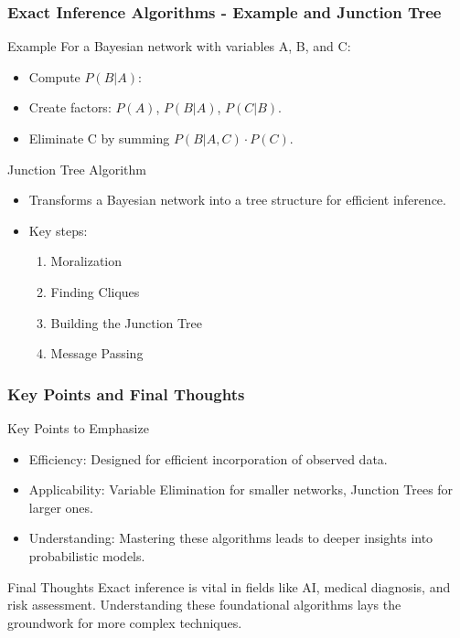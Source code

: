 \documentclass[aspectratio=169]{beamer}
\begin{document}
\begin{frame}[fragile]
    \frametitle{Exact Inference Algorithms - Example and Junction Tree}
    \begin{block}{Example}
        For a Bayesian network with variables A, B, and C:
        \begin{itemize}
            \item Compute $P(B | A)$:
            \item Create factors: $P(A)$, $P(B | A)$, $P(C | B)$.
            \item Eliminate C by summing $P(B | A, C) \cdot P(C)$.
        \end{itemize}
    \end{block}

    \begin{block}{Junction Tree Algorithm}
        \begin{itemize}
            \item Transforms a Bayesian network into a tree structure for efficient inference.
            \item Key steps: 
                \begin{enumerate}
                    \item Moralization
                    \item Finding Cliques
                    \item Building the Junction Tree
                    \item Message Passing
                \end{enumerate}
        \end{itemize}
    \end{block}
\end{frame}

\begin{frame}[fragile]
    \frametitle{Key Points and Final Thoughts}
    \begin{block}{Key Points to Emphasize}
        \begin{itemize}
            \item Efficiency: Designed for efficient incorporation of observed data.
            \item Applicability: Variable Elimination for smaller networks, Junction Trees for larger ones.
            \item Understanding: Mastering these algorithms leads to deeper insights into probabilistic models.
        \end{itemize}
    \end{block}
    
    \begin{block}{Final Thoughts}
        Exact inference is vital in fields like AI, medical diagnosis, and risk assessment. Understanding these foundational algorithms lays the groundwork for more complex techniques.
    \end{block}
\end{frame}
\end{document}
